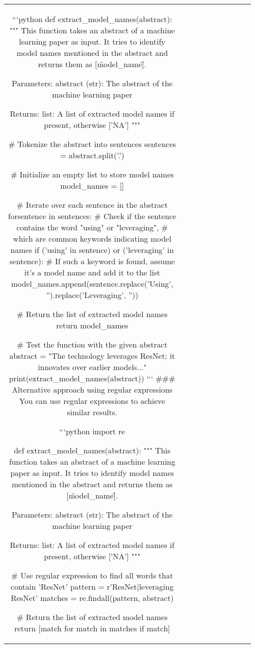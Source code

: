 \begin{table}[h!]
\begin{tabular}{|c|c|c|c|c|c|c|c|c|c|}
```python
def extract_model_names(abstract):
    """
    This function takes an abstract of a machine learning paper as input.
    It tries to identify model names mentioned in the abstract and returns them as [\"model_name\"].
    
    Parameters:
    abstract (str): The abstract of the machine learning paper
    
    Returns:
    list: A list of extracted model names if present, otherwise ['NA']
    """
    
    # Tokenize the abstract into sentences
    sentences = abstract.split('.')

    # Initialize an empty list to store model names
    model_names = []

    # Iterate over each sentence in the abstract
    forsentence in sentences:
        # Check if the sentence contains the word "using" or "leveraging", 
        # which are common keywords indicating model names
        if ('using' in sentence) or ('leveraging' in sentence):
            # If such a keyword is found, assume it's a model name and add it to the list
            model_names.append(sentence.replace('Using', '').replace('Leveraging', ''))

    # Return the list of extracted model names
    return model_names


# Test the function with the given abstract
abstract = "The technology leverages ResNet; it innovates over earlier models..."
print(extract_model_names(abstract))
```
### Alternative approach using regular expressions
You can use regular expressions to achieve similar results.

```python
import re

def extract_model_names(abstract):
    """
    This function takes an abstract of a machine learning paper as input.
    It tries to identify model names mentioned in the abstract and returns them as [\"model_name\"].
    
    Parameters:
    abstract (str): The abstract of the machine learning paper
    
    Returns:
    list: A list of extracted model names if present, otherwise ['NA']
    """
    
    # Use regular expression to find all words that contain 'ResNet'
    pattern = r'ResNet|leveraging ResNet'
    matches = re.findall(pattern, abstract)
    
    # Return the list of extracted model names
    return [match for match in matches if match]


\end{tabular}
\end{table}
